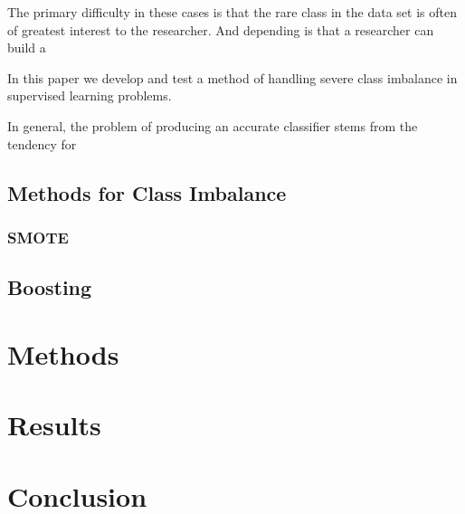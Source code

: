 \documentclass[10pt]{article}
\begin{document}
The primary difficulty in these cases is that the rare class in the data set is often of greatest interest to the researcher. And depending is that a researcher can build a 

In this paper we develop and test a method of handling severe class imbalance in supervised learning problems.

In general, the problem of producing an accurate classifier stems from the tendency for  


\subsection{Methods for Class Imbalance}

\subsubsection{SMOTE}

\subsection{Boosting}

\section{Methods}

\section{Results}

\section{Conclusion}

  
\newpage 



\end{document}
